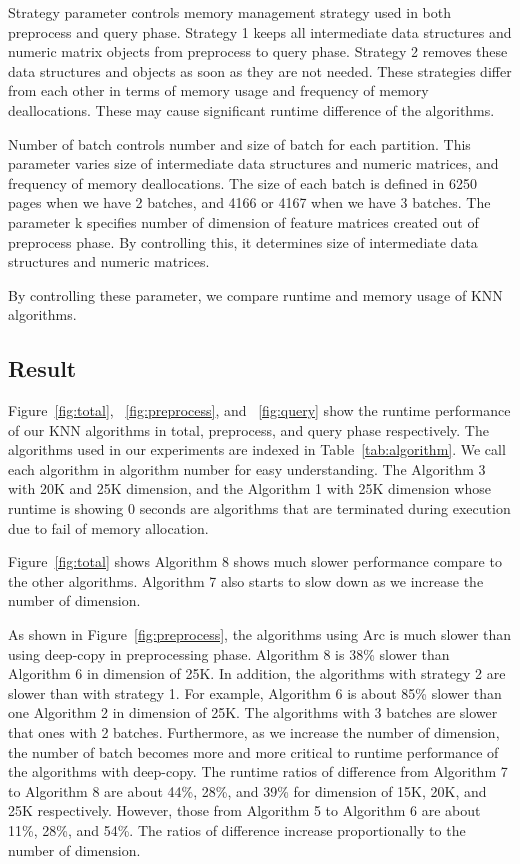 Strategy parameter controls memory management strategy used in both preprocess and query phase.
Strategy 1 keeps all intermediate data structures and numeric matrix objects from preprocess to query phase. 
Strategy 2 removes these data structures and objects as soon as they are not needed. 
These strategies differ from each other in terms of memory usage and frequency of memory deallocations.
These may cause significant runtime difference of the algorithms.

Number of batch controls number and size of batch for each partition. This parameter varies size of intermediate data structures and numeric matrices, and 
frequency of memory deallocations. 
The size of each batch is defined in 6250 pages when we have 2 batches, and 4166 or 4167 when we have 3 batches. 
The parameter k specifies number of dimension of feature matrices created out of preprocess phase. 
By controlling this, it determines size of intermediate data structures and numeric matrices. 

By controlling these parameter, we compare runtime and memory usage of KNN algorithms. 


\subsection{Result}
\label{sec:history}
Figure~\ref{fig:total}, ~\ref{fig:preprocess}, and ~\ref{fig:query} show the runtime performance of our KNN algorithms in total, preprocess, and query phase respectively. 
The algorithms used in our experiments are indexed in Table~\ref{tab:algorithm}. We call each algorithm in algorithm number for easy understanding.
The Algorithm 3 with 20K and 25K dimension, and the Algorithm 1 with 25K dimension whose runtime is showing 0 seconds are algorithms that are terminated during execution due to fail of memory allocation.

Figure~\ref{fig:total} shows Algorithm 8 shows much slower performance compare to the other algorithms.
Algorithm 7 also starts to slow down as we increase the number of dimension.  

As shown in Figure~\ref{fig:preprocess}, the algorithms using Arc is much slower than using deep-copy in preprocessing phase. 
Algorithm 8 is 38\%  slower than Algorithm 6 in dimension of 25K. 
In addition, the algorithms with strategy 2 are slower than with strategy 1. 
For example, Algorithm 6 is about 85\% slower than one Algorithm 2 in dimension of 25K.
The algorithms with 3 batches are slower that ones with 2 batches. Furthermore, as we increase the number of dimension, the number of batch becomes more and more critical to runtime performance of the algorithms with deep-copy.
The runtime ratios of difference from Algorithm 7 to Algorithm 8 are about 44\%, 28\%, and 39\% for dimension of 15K, 20K, and 25K respectively. 
However, those from Algorithm 5 to Algorithm 6 are about 11\%, 28\%, and 54\%. The ratios of difference increase proportionally to the number of dimension. 


